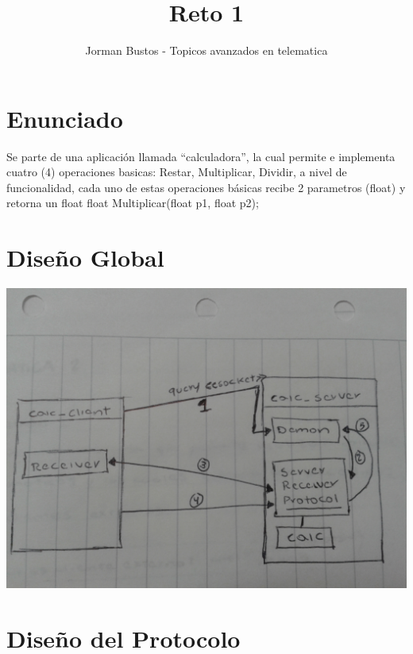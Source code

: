\documentclass[12pt]{article}
\title{Reto 1}
\author{Jorman Bustos - Topicos avanzados en telematica}
\begin{document}
\maketitle


\section{Enunciado}
Se parte de una aplicación llamada “calculadora”, la cual permite e implementa cuatro (4) operaciones basicas: Restar, Multiplicar, Dividir,
a nivel de funcionalidad, cada uno de estas operaciones básicas recibe 2 parametros (float) y retorna un float
float Multiplicar(float p1, float p2);
  

\section{Dise\~no Global}
  \includegraphics[scale=.1]{tales.jpg}
  
\section{Diseño del Protocolo}
\end{document}
